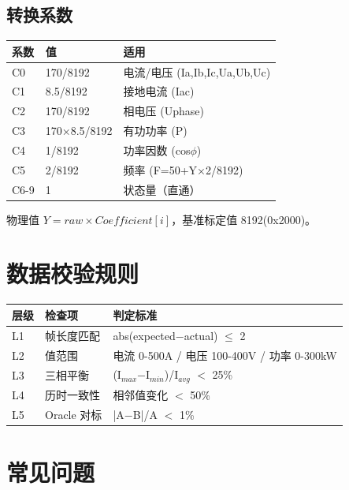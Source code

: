 \documentclass[12pt,a4paper]{ctexart}
\begin{document}
\subsection{转换系数}
\begin{table}[H]\centering
\begin{tabular}{lll}
\toprule
\textbf{系数} & \textbf{值} & \textbf{适用} \\
\midrule
C0 & 170/8192 & 电流/电压 (Ia,Ib,Ic,Ua,Ub,Uc) \\
C1 & 8.5/8192 & 接地电流 (Iac) \\
C2 & 170/8192 & 相电压 (Uphase) \\
C3 & 170×8.5/8192 & 有功功率 (P) \\
C4 & 1/8192 & 功率因数 (cos$\phi$) \\
C5 & 2/8192 & 频率 (F=50+Y×2/8192) \\
C6-9 & 1 & 状态量（直通） \\
\bottomrule
\end{tabular}
\end{table}

物理值 $Y = raw \times Coefficient[i]$，基准标定值 8192(0x2000)。

\section{数据校验规则}

\begin{table}[H]\centering
\begin{tabular}{lll}
\toprule
\textbf{层级} & \textbf{检查项} & \textbf{判定标准} \\
\midrule
L1 & 帧长度匹配 & abs(expected$-$actual) $\leq$ 2 \\
L2 & 值范围 & 电流 0-500A / 电压 100-400V / 功率 0-300kW \\
L3 & 三相平衡 & (I$_{max}$$-$I$_{min}$)/I$_{avg}$ $<$ 25\% \\
L4 & 历时一致性 & 相邻值变化 $<$ 50\% \\
L5 & Oracle 对标 & |A$-$B|/A $<$ 1\% \\
\bottomrule
\end{tabular}
\end{table}

\section{常见问题}
\end{document}
